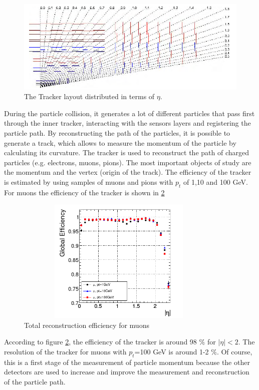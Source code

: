 \begin{figure}[ht]
	\centering
	\includegraphics[scale=0.7]{Chapter2/pixel2.png}
	\caption[The Tracker layout distributed in terms of $\eta$]{The Tracker layout distributed in terms of $\eta$\cite{cms-manual}.}
	\label{pixel2}
\end{figure}
During the particle collision, it generates a lot of different particles that pass first through the inner tracker, interacting with the sensors layers and registering the particle path.
By reconstructing the path of the particles, it is possible to generate a track, which allows to measure the momentum of the particle by calculating its curvature. The tracker is used to reconstruct the path of charged particles (e.g. electrons, muons, pions). The most important objects of study are the momentum and the vertex (origin of the track). The efficiency of the tracker is estimated by using samples of muons and pions with $p_t$ of 1,10 and 100 GeV. 
For muons the efficiency of the tracker is shown in \ref{efi}
\begin{figure}[ht]
	\centering
	\includegraphics[width=10cm,height=6cm]{Chapter2/tracker.png}
	\caption[Total reconstruction efficiency for muons]{Total reconstruction efficiency for muons\cite{cms-manual} }\label{efi}
\end{figure}

According to figure \ref{efi}, the efficiency of the tracker is around 98 $\%$ for $|\eta|<2$. The resolution of the tracker for muons with $p_t$=100 GeV is around 1-2 $\%$.
Of course, this is a first stage of the measurement of particle momentum because the other detectors are used to increase and improve the measurement and reconstruction of the particle path.

